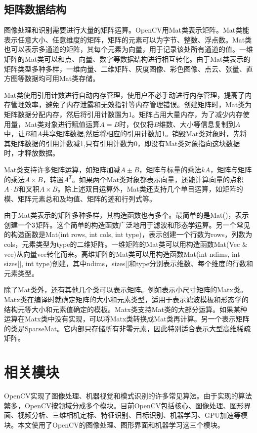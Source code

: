 \subsection{矩阵数据结构}


图像处理和识别需要进行大量的矩阵运算。OpenCV用Mat类表示矩阵。Mat类能表示任意大小、任意维度的矩阵，矩阵的元素可以为字节、整数、浮点数。Mat类也可以表示多通道的矩阵，其每个元素为向量，用于记录该处所有通道的值。一维矩阵的Mat类可以和点、向量、数字等数据结构进行相互转化。由于Mat类表示的矩阵类型多种多样，一维向量、二维矩阵、灰度图像、彩色图像、点云、张量、直方图等数据均可用Mat类存储。

Mat类使用引用计数进行自动内存管理，使用户不必手动进行内存管理，提高了内存管理效率，避免了内存泄露和无效指针等内存管理错误。创建矩阵时，Mat类为矩阵数据分配内存，然后将引用计数置为1。矩阵占用大量内存，为了减少内存使用量，Mat类对象进行赋值运算$A=B$时，仅仅将$B$维数、大小等信息复制到$A$中，让$B$和$A$共享矩阵数据,然后将相应的引用计数加1。销毁Mat类对象时，先将其矩阵数据的引用计数减1,只有引用计数为0，即没有Mat类对象指向这块数据时，才释放数据。

Mat类支持许多矩阵运算，如矩阵加减$A\pm B$，矩阵与标量的乘法$kA$，矩阵与矩阵的乘法$A\times B$，转置$A^T$。如果两个Mat类对象都表示向量，还能计算向量的点积$A\cdot B$和叉积$A\times B$。除上述双目运算外，Mat类还支持几个单目运算，如矩阵的模、矩阵元素总和及均值、矩阵的迹和行列式等。

由于Mat类表示的矩阵多种多样，其构造函数也有多个。最简单的是Mat()，表示创建一个$3\time 3$矩阵。这个简单的构造函数广泛地用于滤波和形态学运算。另一个常见的构造函数是Mat(int rows, int cols, int type)，表示创建一个行数为rows，列数为cols，元素类型为type的二维矩阵。一维矩阵的Mat类可以用构造函数Mat(Vec \& vec)从向量vec转化而来。高维矩阵的Mat类可以用构造函数Mat(int ndims, int sizes[], int type)创建，其中ndims，sizes[]和type分别表示维数、每个维度的行数和元素类型。

除了Mat类外，还有其他几个类可以表示矩阵。例如表示小尺寸矩阵的Matx类。Matx类在编译时就确定矩阵的大小和元素类型，适用于表示滤波模板和形态学的结构元等大小和元素值确定的模板。Matx类支持Mat类的大部分运算。如果某种运算在Matx类中没有实现，可以将Matx类转换成Mat类再计算。另一个表示矩阵的类是SparseMat。它内部只存储所有非零元素，因此特别适合表示大型高维稀疏矩阵。

\section{相关模块}

OpenCV实现了图像处理、机器视觉和模式识别的许多常见算法。由于实现的算法繁多，OpenCV按领域分成多个模块。目前OpenCV包括核心、图像处理、图形界面、视频分析、三维相机定标、特征识别、目标识别、机器学习、GPU加速等模块。本文使用了OpenCV的图像处理、图形界面和机器学习这三个模块。

